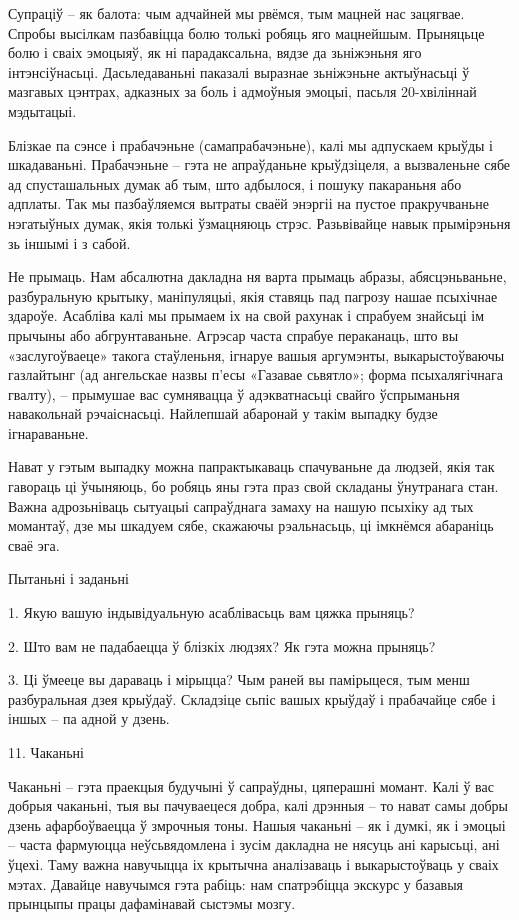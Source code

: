 Супраціў – як балота: чым адчайней мы рвёмся, тым мацней нас зацягвае. Спробы высілкам пазбавіцца болю толькі робяць яго мацнейшым. Прыняцьце болю і сваіх эмоцыяў, як ні парадаксальна, вядзе да зьніжэньня яго інтэнсіўнасьці. Дасьледаваньні паказалі выразнае зьніжэньне актыўнасьці ў мазгавых цэнтрах, адказных за боль і адмоўныя эмоцыі, пасьля 20-хвіліннай мэдытацыі.

Блізкае па сэнсе і прабачэньне (самапрабачэньне), калі мы адпускаем крыўды і шкадаваньні. Прабачэньне – гэта не апраўданьне крыўдзіцеля, а вызваленьне сябе ад спусташальных думак аб тым, што адбылося, і пошуку пакараньня або адплаты. Так мы пазбаўляемся вытраты сваёй энэргіі на пустое пракручваньне нэгатыўных думак, якія толькі ўзмацняюць стрэс. Разьвівайце навык прымірэньня зь іншымі і з сабой.

Не прымаць. Нам абсалютна дакладна ня варта прымаць абразы, абясцэньваньне, разбуральную крытыку, маніпуляцыі, якія ставяць пад пагрозу нашае псыхічнае здароўе. Асабліва калі мы прымаем іх на свой рахунак і спрабуем знайсьці ім прычыны або абгрунтаваньне. Агрэсар часта спрабуе пераканаць, што вы «заслугоўваеце» такога стаўленьня, ігнаруе вашыя аргумэнты, выкарыстоўваючы газлайтынг (ад ангельскае назвы п'есы «Газавае сьвятло»; форма псыхалягічнага гвалту), – прымушае вас сумнявацца ў адэкватнасьці свайго ўспрыманьня навакольнай рэчаіснасьці. Найлепшай абаронай у такім выпадку будзе ігнараваньне.

Нават у гэтым выпадку можна папрактыкаваць спачуваньне да людзей, якія так гавораць ці ўчыняюць, бо робяць яны гэта праз свой складаны ўнутранага стан. Важна адрозьніваць сытуацыі сапраўднага замаху на нашую псыхіку ад тых момантаў, дзе мы шкадуем сябе, скажаючы рэальнасьць, ці імкнёмся абараніць сваё эга.

Пытаньні і заданьні

1. Якую вашую індывідуальную асаблівасьць вам цяжка прыняць?

2. Што вам не падабаецца ў блізкіх людзях? Як гэта можна прыняць?

3. Ці ўмееце вы дараваць і мірыцца? Чым раней вы памірыцеся, тым менш разбуральная дзея крыўдаў. Складзіце сьпіс вашых крыўдаў і прабачайце сябе і іншых – па адной у дзень.


11. Чаканьні

Чаканьні – гэта праекцыя будучыні ў сапраўдны, цяперашні момант. Калі ў вас добрыя чаканьні, тыя вы пачуваецеся добра, калі дрэнныя – то нават самы добры дзень афарбоўваецца ў змрочныя тоны. Нашыя чаканьні – як і думкі, як і эмоцыі – часта фармуюцца неўсьвядомлена і зусім дакладна не нясуць ані карысьці, ані ўцехі. Таму важна навучыцца іх крытычна аналізаваць і выкарыстоўваць у сваіх мэтах. Давайце навучымся гэта рабіць: нам спатрэбіцца экскурс у базавыя прынцыпы працы дафамінавай сыстэмы мозгу.


